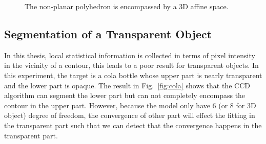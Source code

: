 \begin{figure}[htbp]
\begin{minipage}[t]{0.5\linewidth}
  \end{minipage} 
  \begin{minipage}[t]{0.5\linewidth} 
    \centering 
  \end{minipage} 
\caption[3D affine shape-space for rigid object]{The
  non-planar polyhedron is encompassed by a 3D affine space.}
\label{fig:container}
\end{figure}

\subsection{Segmentation of a Transparent Object}
\label{sec:sto}
In this thesis, local statistical information is collected in terms of
pixel intensity in the vicinity of a contour, this leads to a poor
result for transparent objects. In this experiment, the
target is a cola bottle whose upper part is nearly transparent and the
lower part is opaque. The result in Fig.~\ref{fig:cola} shows that the CCD algorithm
can segment the lower part but can not completely encompass the contour in the
upper part. However, because the model only have 6 (or 8
for 3D object) degree of freedom, the convergence of other
part will effect the fitting in the transparent part such that we can
detect that the convergence happens in the transparent part.


